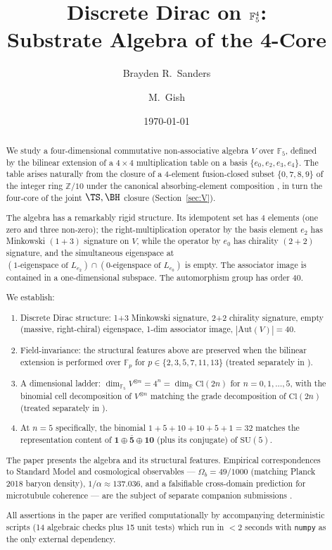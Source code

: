 \documentclass[11pt,reqno]{amsart}
\title[Discrete Dirac on $\F_5^4$]
{Discrete Dirac on $\F_5^4$: \\
 Substrate Algebra of the 4-Core}
\author{Brayden R.~Sanders}
\author{M.~Gish}
\date{\today}
\theoremstyle{plain}
\theoremstyle{definition}
\theoremstyle{remark}
\newcommand{\Z}{\mathbb{Z}}
\newcommand{\F}{\mathbb{F}}
\newcommand{\R}{\mathbb{R}}
\newcommand{\Cl}{\mathrm{Cl}}
\newcommand{\Aut}{\mathrm{Aut}}
\begin{document}
\begin{abstract}
We study a four-dimensional commutative non-associative algebra $V$ over
$\F_5$, defined by the bilinear extension of a $4 \times 4$ multiplication
table on a basis $\{e_0, e_2, e_3, e_4\}$. The table arises naturally from
the closure of a 4-element fusion-closed subset $\{0,7,8,9\}$ of the integer
ring $\Z/10$ under the canonical absorbing-element composition
\cite{SandersGishFourCore}, in turn the four-core of the joint
$\TS, \BH$ closure (Section~\ref{sec:V}).

The algebra has a remarkably rigid structure. Its idempotent set has 4
elements (one zero and three non-zero); the right-multiplication operator
by the basis element $e_2$ has Minkowski $(1{+}3)$ signature on $V$, while
the operator by $e_0$ has chirality $(2{+}2)$ signature, and the
simultaneous eigenspace at $(\text{1-eigenspace of } L_{e_2}) \cap
(\text{0-eigenspace of } L_{e_0})$ is empty. The associator image is
contained in a one-dimensional subspace. The automorphism group has
order 40.

We establish:
\begin{enumerate}[label={(\arabic*)}]
\item Discrete Dirac structure: 1+3 Minkowski signature, 2+2 chirality
signature, empty (massive, right-chiral) eigenspace, 1-dim associator
image, $|\Aut(V)| = 40$.
\item Field-invariance: the structural features above are preserved when
the bilinear extension is performed over $\F_p$ for
$p \in \{2,3,5,7,11,13\}$ (treated separately in
\cite{SandersGishFpUniversality}).
\item A dimensional ladder: $\dim_{\F_5} V^{\otimes n} = 4^n =
\dim_\R \Cl(2n)$ for $n=0,1,\ldots,5$, with the binomial cell
decomposition of $V^{\otimes n}$ matching the grade decomposition of
$\Cl(2n)$ (treated separately in \cite{SandersGishCliffordLadder}).
\item At $n=5$ specifically, the binomial $1+5+10+10+5+1 = 32$ matches the
representation content of $\mathbf{1} \oplus \bar{\mathbf{5}} \oplus \mathbf{10}$
(plus its conjugate) of $\mathrm{SU}(5)$.
\end{enumerate}

The paper presents the algebra and its structural features. Empirical
correspondences to Standard Model and cosmological observables ---
$\Omega_b = 49/1000$ (matching Planck 2018 baryon density),
$1/\alpha \approx 137.036$, and a falsifiable cross-domain prediction
for microtubule coherence --- are the subject of separate companion
submissions \cite{SandersJohnsonDarkSector,SandersJohnsonMassHierarchy}.

All assertions in the paper are verified computationally by accompanying
deterministic scripts (14 algebraic checks plus 15 unit tests) which
run in $<2$ seconds with \texttt{numpy} as the only external dependency.
\end{abstract}
\end{document}
